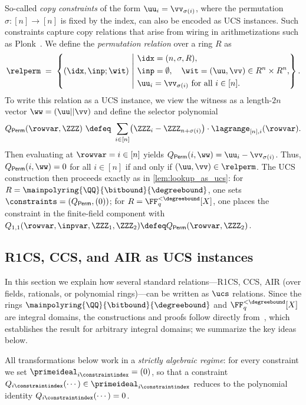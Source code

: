 \begin{remark}
\label{rem:perm_as_ucs}
So-called \emph{copy constraints} of the form $\uu_i = \vv_{\sigma(i)}$, where the permutation $\sigma:[n]\to[n]$ is fixed by the index, can also be encoded as UCS instances.
Such constraints capture copy relations that arise from wiring in arithmetizations such as Plonk~\cite{GWC19}.
We define the \emph{permutation relation} over a ring $R$ as
\[
\relperm
\;=\;
\left\{(\idx,\inp;\wit)\ \middle|\ 
\begin{aligned}
&\idx=(n,\sigma,R),\\
&\inp=\emptyset,\quad \wit=(\uu,\vv)\in R^{n}\times R^{n},\\
&\uu_i=\vv_{\sigma(i)}\text{ for all }i\in[n].
\end{aligned}
\right\}.
\]
To write this relation as a UCS instance, we view the witness as a length-$2n$ vector $\ww = (\uu || \vv)$ and define the selector polynomial
\[
Q_{\mathsf{Perm}}(\rowvar,\ZZZ)\ \defeq\
\sum_{i\in[n]}
\bigl(\ZZZ_{i}-\ZZZ_{n+\sigma(i)}\bigr)\cdot \lagrange_{[n],i}(\rowvar).
\]
Then evaluating at $\rowvar = i\in [n]$ yields $Q_{\mathsf{Perm}}(i,\ww) = \uu_i - \vv_{\sigma(i)}$.
Thus, $Q_{\mathsf{Perm}}(i,\ww) = 0$ for all $i \in [n]$ if and only if $(\uu,\vv) \in \relperm$.
The UCS construction then proceeds exactly as in \cref{lem:lookup_as_ucs}: for $R = \mainpolyring{\QQ}{\bitbound}{\degreebound}$, one sets $\constraints = (Q_{\mathsf{Perm}}, (0))$; for $R = \FF_q^{<\degreebound}[X]$, one places the constraint in the finite-field component with $Q_{1,1}(\rowvar,\inpvar,\ZZZ_1,\ZZZ_2) \defeq Q_{\mathsf{Perm}}(\rowvar,\ZZZ_2)$.
\end{remark}

\subsection{R1CS, CCS, and AIR as UCS instances}\label{ss:ucs_r1cs}

In this section we explain how several standard relations---R1CS, CCS, AIR (over fields, rationals, or polynomial rings)---can be written as $\ucs$ relations. 
Since the rings $\mainpolyring{\QQ}{\bitbound}{\degreebound}$ and $\FF_q^{<\degreebound}[X]$ are integral domains, the constructions and proofs follow directly from~\cite[Section~4.4]{Zinc}, which establishes the result for arbitrary integral domains; we summarize the key ideas below.

All transformations below work in a \emph{strictly algebraic regime}: for every constraint we set $\primeideal_{i\constraintindex}=(0)$, so that a constraint $Q_{i\constraintindex}(\cdots)\in\primeideal_{i\constraintindex}$ reduces to the polynomial identity $Q_{i\constraintindex}(\cdots)=0$.

